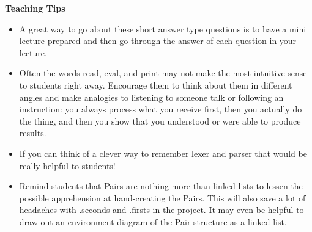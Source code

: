 \begin{parts}
\end{parts}

\begin{guide}
\textbf{Teaching Tips}
\begin{itemize}
	\item A great way to go about these short answer type questions is to have a mini lecture prepared and then go through the answer of each question in your lecture.
	\item Often the words read, eval, and print may not make the most intuitive sense to students right away. Encourage them to think about them in different angles and make analogies to listening to someone talk or following an instruction: you always process what you receive first, then you actually do the thing, and then you show that you understood or were able to produce results.
	\item If you can think of a clever way to remember lexer and parser that would be really helpful to students!
	\item Remind students that Pairs are nothing more than linked lists to lessen the possible apprehension at hand-creating the Pairs. This will also save a lot of headaches with .seconds and .firsts in the project. It may even be helpful to draw out an environment diagram of the Pair structure as a linked list.
\end{itemize}
\end{guide}